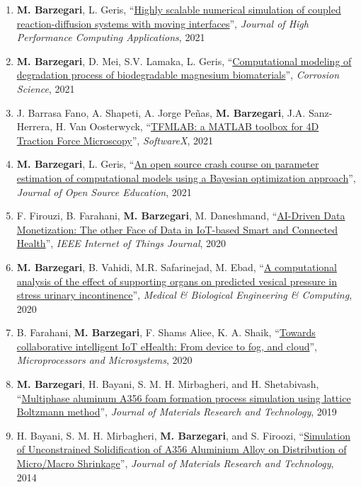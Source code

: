 \documentclass{cv}
\begin{document}
\begin{enumerate}[itemsep=-0.2ex]
\item
\textbf{M. Barzegari}, L. Geris, ``\href{https://doi.org/10.1177/10943420211045939}{Highly scalable numerical simulation of coupled reaction-diffusion systems with moving interfaces}'', \textit{Journal of High Performance Computing Applications}, 2021
\item
\textbf{M. Barzegari}, D. Mei, S.V. Lamaka, L. Geris, ``\href{https://doi.org/10.1016/j.corsci.2021.109674}{Computational modeling of degradation process of biodegradable magnesium biomaterials}'', \textit{Corrosion Science}, 2021
\item
J. Barrasa Fano, A. Shapeti, A. Jorge Peñas, \textbf{M. Barzegari}, J.A. Sanz-Herrera, H. Van Oosterwyck, ``\href{https://doi.org/10.1016/j.softx.2021.100723}{TFMLAB: a MATLAB toolbox for 4D Traction Force Microscopy}'', \textit{SoftwareX}, 2021 
\item
\textbf{M. Barzegari}, L. Geris, ``\href{https://doi.org/10.21105/jose.00089}{An open source crash course on parameter estimation of computational models using a Bayesian optimization approach}'', \textit{Journal of Open Source Education}, 2021
\item
F. Firouzi, B. Farahani, \textbf{M. Barzegari}, M. Daneshmand, ``\href{https://doi.org/10.1109/JIOT.2020.3027971}{AI-Driven Data Monetization: The other Face of Data in IoT-based Smart and Connected Health}'', \textit{IEEE Internet of Things Journal}, 2020
\item
\textbf{M. Barzegari}, B. Vahidi, M.R. Safarinejad, M. Ebad, ``\href{https://doi.org/10.1007/s11517-020-02148-2}{A computational analysis of the effect of supporting organs on predicted vesical pressure in stress urinary incontinence}'', \textit{Medical \& Biological Engineering \& Computing}, 2020
\item
B. Farahani, \textbf{M. Barzegari}, F. Shams Aliee, K. A. Shaik, ``\href{https://doi.org/10.1016/j.micpro.2019.102938}{Towards collaborative intelligent IoT eHealth: From device to fog, and cloud}'', \textit{Microprocessors and Microsystems}, 2020
\item
\textbf{M. Barzegari}, H. Bayani, S. M. H. Mirbagheri, and H. Shetabivash, ``\href{https://doi.org/10.1016/j.jmrt.2018.03.010}{Multiphase aluminum A356 foam formation process simulation using lattice Boltzmann method}'', \textit{Journal of Materials Research and Technology}, 2019
\item
H. Bayani, S. M. H. Mirbagheri, \textbf{M. Barzegari}, and S. Firoozi, ``\href{http://www.sciencedirect.com/science/article/pii/S2238785413001129}{Simulation of Unconstrained Solidification of A356 Aluminium Alloy on Distribution of Micro/Macro Shrinkage}'', \textit{Journal of Materials Research and Technology}, 2014
\end{enumerate}
\end{document}
